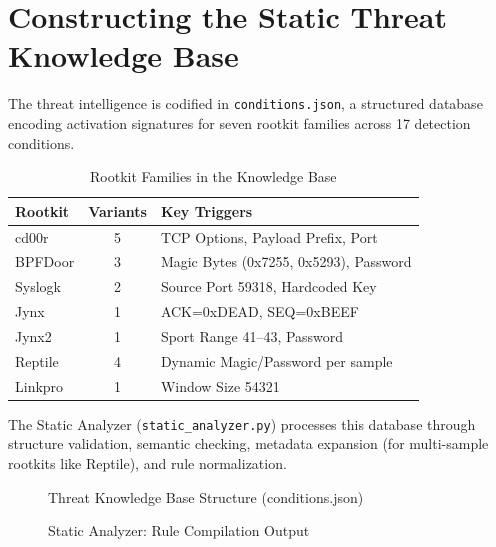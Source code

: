 \section{Constructing the Static Threat Knowledge Base}

The threat intelligence is codified in \texttt{conditions.json}, a structured database encoding activation signatures for seven rootkit families across 17 detection conditions.

\begin{table}[h]
\centering
\caption{Rootkit Families in the Knowledge Base}
\label{tab:rootkit_families}
\begin{tabular}{|l|c|l|}
\hline
\textbf{Rootkit} & \textbf{Variants} & \textbf{Key Triggers} \\
\hline
cd00r & 5 & TCP Options, Payload Prefix, Port \\
\hline
BPFDoor & 3 & Magic Bytes (0x7255, 0x5293), Password \\
\hline
Syslogk & 2 & Source Port 59318, Hardcoded Key \\
\hline
Jynx & 1 & ACK=0xDEAD, SEQ=0xBEEF \\
\hline
Jynx2 & 1 & Sport Range 41--43, Password \\
\hline
Reptile & 4 & Dynamic Magic/Password per sample \\
\hline
Linkpro & 1 & Window Size 54321 \\
\hline
\end{tabular}
\end{table}

The Static Analyzer (\texttt{static\_analyzer.py}) processes this database through structure validation, semantic checking, metadata expansion (for multi-sample rootkits like Reptile), and rule normalization.

\begin{figure}[h]
\centering
{}
\caption{Threat Knowledge Base Structure (conditions.json)}
\label{fig:conditions_json}
\end{figure}

\begin{figure}[h]
\centering
{}
\caption{Static Analyzer: Rule Compilation Output}
\label{fig:static_analyzer_output}
\end{figure}

